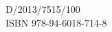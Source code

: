 \begin{flushleft}
D/2013/7515/100\\
ISBN 978-94-6018-714-8\\
\end{flushleft}


\pagestyle{empty}
\newpage




